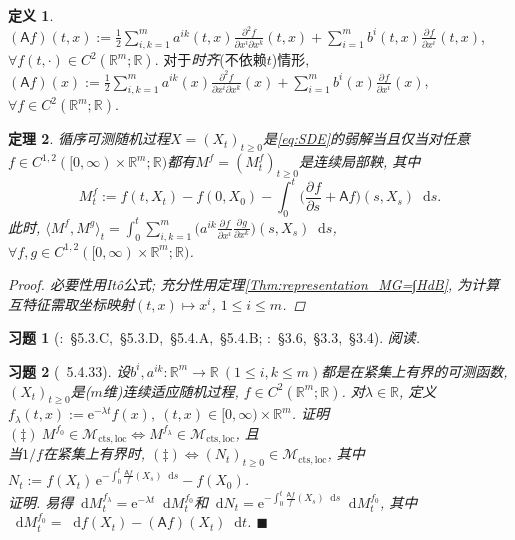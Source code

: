 \documentclass{ctexart}
\theoremstyle{definition}
\newtheorem{Def}{定义}[section]
\theoremstyle{remark}
\theoremstyle{plain}
\newtheorem{Thm}[Def]{定理}
\newtheorem{Ex}{习题}[section]
\newenvironment{Prf}{\vspace{1ex}\textbf{\\}{\color{red}\textit{证明}}.\normalfont}{\color{red}\hfill$\blacksquare$\vspace{1ex}\par}
\newcommand{\1}{\mathbbm{1}}				%
\newcommand{\agp}[1]{\langle #1 \rangle}	%
\newcommand{\R}{\mathbb{R}}					%
\renewcommand*{\d}{\mathop{}\!\mathrm{d}}	%
\newcommand{\pd}{\partial}					%
\newcommand{\p}[3][]{\frac{\pd^{#1}#2}{\pd{#3}^{#1}}}%
\newcommand{\e}{\mathrm{e}}
\begin{document}
\begin{Def}
$(\mathsf{A}f)(t,x) := \frac{1}{2}\sum_{i,k=1}^{m}a^{ik}(t,x)\frac{\pd^{2}f}{\pd x^{i} \pd x^{k}}(t,x) + \sum_{i=1}^{m}b^{i}(t,x)\p{f}{x^i}(t,x)$, $\forall f(t,\bm{\cdot}) \in C^{2}(\R^{m};\R)$.
对于\emph{时齐}(不依赖$t$)情形, $(\mathsf{A}f)(x) := \frac{1}{2}\sum_{i,k=1}^{m}a^{ik}(x)\frac{\pd^{2}f}{\pd x^{i} \pd x^{k}}(x) + \sum_{i=1}^{m}b^{i}(x)\p{f}{x^i}(x)$, $\forall f \in C^{2}(\R^{m};\R)$.
\end{Def}

\begin{Thm}\label{Thm:Stroock--Varadhan}
循序可测随机过程$X = (X_{t})_{t \ge 0}$是\eqref{eq:SDE}的弱解当且仅当对任意$f \in C^{1,2}([0,\infty)\times\R^{m};\R)$都有$M^{f} = (M^{f}_{t})_{t \ge 0}$是连续局部鞅, 其中
\[ M^{f}_{t} := f(t,X_{t}) - f(0,X_{0}) - \int_{0}^{t} \Big( \p{f}{s} + \mathsf{A}f \Big)(s,X_{s}) \d s . \]
此时, $\agp{M^{f},M^{g}}_{t} = \int_{0}^{t} \sum_{i,k=1}^{m}\big(a^{ik}\p{f}{x^i}\p{g}{x^k}\big)(s,X_{s}) \d s$, $\forall f,g \in C^{1,2}([0,\infty)\times\R^{m};\R)$.
\begin{proof}
必要性用It\^{o}公式; 充分性用定理\ref{Thm:representation_MG=∫HdB}, 为计算互特征需取坐标映射$(t,x) \mapsto x^i$, $1 \le i \le m$.
\end{proof}
\end{Thm}


\begin{Ex}[\cite{Karatzas-Shreve--GTM113}:~\S5.3.C,~\S5.3.D,~\S5.4.A,~\S5.4.B; \cite{龚光鲁-钱敏平}:~\S3.6,~\S3.3,~\S3.4]
阅读.
\end{Ex}


\begin{Ex}[\cite{Karatzas-Shreve--GTM113}~5.4.33]
设$b^{i},a^{ik} : \R^{m} \to \R \ (1 \le i,k \le m)$都是在紧集上有界的可测函数, $(X_{t})_{t \ge 0}$是($m$维)连续适应随机过程, $f \in C^{2}(\R^{m};\R)$. 对$\lambda \in \R$, 定义$f_{\lambda}(t,x) := \e^{-\lambda t} f(x) ,\ (t,x) \in [0,\infty)\times\R^{m}$. 证明$(\ddagger) ~ M^{f_0} \in \mathcal{M}_{\mathrm{cts},\mathrm{loc}} \iff M^{f_\lambda} \in \mathcal{M}_{\mathrm{cts},\mathrm{loc}}$, 且\\ 当$1/f$在紧集上有界时, $(\ddagger) \iff (N_{t})_{t \ge 0} \in \mathcal{M}_{\mathrm{cts},\mathrm{loc}}$, 其中$N_{t} := f(X_{t}) \,\e^{-\int_{0}^{t} \frac{\mathsf{A}f}{f}(X_{s}) \d s} - f(X_{0})$.
\begin{Prf}
易得$\d M^{f_\lambda}_{t} = \e^{-\lambda t} \d M^{f_0}_{t}$和$\d N_{t} = \e^{-\int_{0}^{t} \frac{\mathsf{A}f}{f}(X_{s}) \d s} \d M^{f_0}_{t}$, 其中$\d M^{f_0}_{t} = \d f(X_{t}) - (\mathsf{A}f)(X_{t}) \d t$.
\end{Prf}
\end{Ex}
\end{document}
